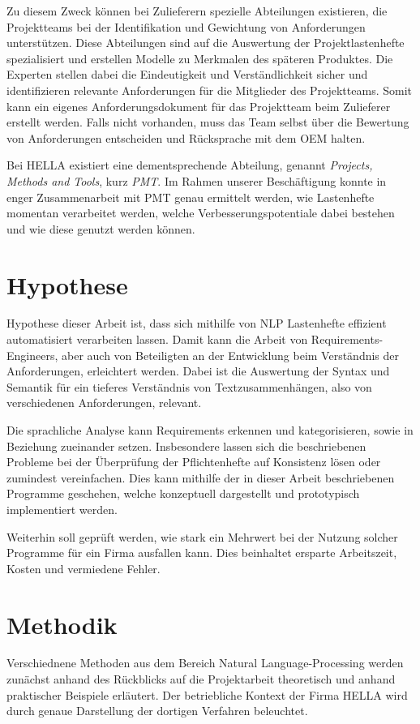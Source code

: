\documentclass[12pt]{report}
\begin{document}
Zu diesem Zweck können bei Zulieferern spezielle Abteilungen existieren, die Projektteams bei der Identifikation und Gewichtung von Anforderungen unterstützen. Diese Abteilungen sind auf die Auswertung der Projektlastenhefte spezialisiert und erstellen Modelle zu Merkmalen des späteren Produktes. Die Experten stellen dabei die Eindeutigkeit und Verständlichkeit sicher und identifizieren relevante Anforderungen für die Mitglieder des Projektteams. Somit kann ein eigenes Anforderungsdokument für das Projektteam beim Zulieferer erstellt werden. 
Falls nicht vorhanden, muss das Team selbst über die Bewertung von Anforderungen entscheiden und Rücksprache mit dem OEM halten.

Bei HELLA existiert eine dementsprechende Abteilung, genannt \textit{Projects, Methods and Tools}, kurz \textit{PMT}. Im Rahmen unserer Beschäftigung konnte in enger Zusammenarbeit mit PMT genau ermittelt werden, wie Lastenhefte momentan verarbeitet werden, welche Verbesserungspotentiale dabei bestehen und wie diese genutzt werden können.

\section{Hypothese}
Hypothese dieser Arbeit ist, dass sich mithilfe von NLP Lastenhefte effizient automatisiert verarbeiten lassen. Damit kann die Arbeit von Requirements-Engineers, aber auch von Beteiligten an der Entwicklung beim Verständnis der Anforderungen, erleichtert werden. Dabei ist die Auswertung der Syntax und Semantik für ein tieferes Verständnis von Textzusammenhängen, also von verschiedenen Anforderungen, relevant.

Die sprachliche Analyse kann Requirements erkennen und kategorisieren, sowie in Beziehung zueinander setzen. Insbesondere lassen sich die beschriebenen Probleme bei der Überprüfung der Pflichtenhefte auf Konsistenz lösen oder zumindest vereinfachen. Dies kann mithilfe der in dieser Arbeit beschriebenen Programme geschehen, welche konzeptuell dargestellt und prototypisch implementiert werden. 

Weiterhin soll geprüft werden, wie stark ein Mehrwert bei der Nutzung solcher Programme für ein Firma ausfallen kann. Dies beinhaltet ersparte Arbeitszeit, Kosten und vermiedene Fehler. 

\section{Methodik}
Verschiednene Methoden aus dem Bereich Natural Language-Processing werden zunächst anhand des Rückblicks auf die Projektarbeit theoretisch und anhand praktischer Beispiele erläutert. Der betriebliche Kontext der Firma HELLA wird durch genaue Darstellung der dortigen Verfahren beleuchtet. 
\end{document}
